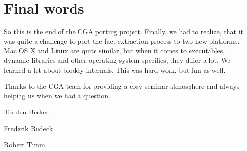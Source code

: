 
\section{Final words} So this is the end of the CGA porting project. Finally, we had to realize, that it was quite a challenge to port the fact extraction process to two new platforms. Mac OS X and Linux are quite similar, but when it comes to executables, dynamic libraries and other operating system specifics, they differ a lot. We learned a lot about bloddy internals. This was hard work, but fun as well. 

Thanks to the CGA team for providing a cosy seminar atmosphere and always helping us when we had a question.

Torsten Becker

Frederik Rudeck

Robert Timm 
